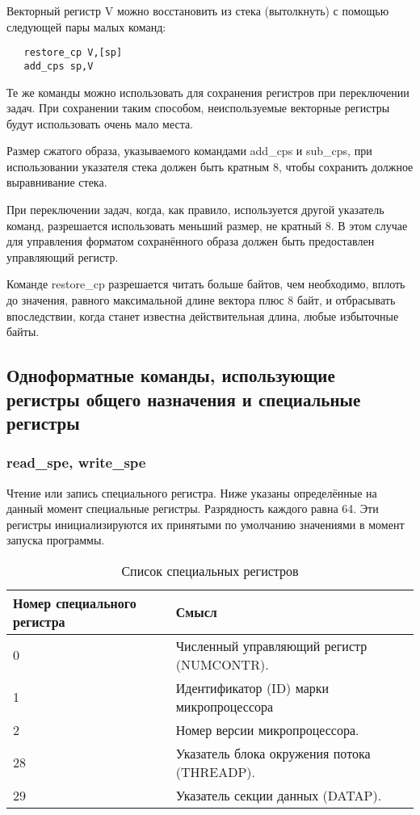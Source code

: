 \documentclass[forwardcom.tex]{subfiles}
\begin{document}
Векторный регистр V можно восстановить из стека (вытолкнуть) с помощью следующей пары малых команд:
\begin{verbatim}
   restore_cp V,[sp]
   add_cps sp,V
\end{verbatim}

Те же команды можно использовать для сохранения регистров при переключении задач. При сохранении таким способом, неиспользуемые векторные регистры будут использовать очень мало места.

Размер сжатого образа, указываемого командами add\_cps и sub\_cps, при использовании указателя стека должен быть кратным 8, чтобы сохранить должное выравнивание стека. 

При переключении задач, когда, как правило, используется другой указатель команд, разрешается использовать меньший размер, не кратный 8. В этом случае для управления форматом сохранённого образа должен быть предоставлен управляющий регистр.

Команде restore\_cp разрешается читать больше байтов, чем необходимо, вплоть до значения, равного максимальной длине вектора плюс 8 байт, и отбрасывать впоследствии, когда станет известна действительная длина, любые избыточные байты.

\subsection{Одноформатные команды, использующие регистры общего назначения и специальные регистры}
\subsubsection{read\_spe, write\_spe}
Чтение или запись специального регистра. Ниже указаны определённые на данный момент специальные регистры. Разрядность каждого равна 64. Эти регистры инициализируются их принятыми по умолчанию значениями в момент запуска программы.

\begin{longtable} {|l|l|}
\caption{Список специальных регистров} 
\label{table:specialRegisters} \\
\endfirsthead
\endhead
\hline
\bfseries Номер специального регистра & \bfseries Смысл  \\ \hline
0                                     & Численный управляющий регистр (NUMCONTR).  \\
1 									  & Идентификатор (ID) марки микропроцессора  \\
2                                     & Номер версии микропроцессора.   \\
28                                    & Указатель блока окружения потока (THREADP).   \\
29                                    & Указатель секции данных (DATAP).  \\
\hline
\end{longtable}
\end{document}
